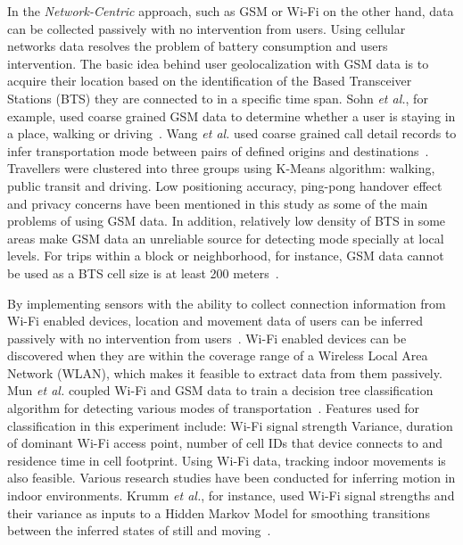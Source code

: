  In the \emph{Network-Centric} approach, such as GSM or Wi-Fi on the other hand, data can be collected passively with no intervention from users. Using cellular networks data resolves the problem of battery consumption and users intervention. The basic idea behind user geolocalization with GSM data is to acquire their location based on the identification of the Based Transceiver Stations (BTS) they are connected to in a specific time span. Sohn \textit{et al.}, for example, used coarse grained GSM data to determine whether a user is staying in a place, walking or driving~\cite{sohn2006mobility}.  Wang \textit{et al.} used coarse grained call detail records to infer transportation mode between pairs of defined origins and destinations~\cite{wang2010transportation}. Travellers were clustered into three groups using K-Means algorithm: walking, public transit and driving. Low positioning accuracy, ping-pong handover effect and privacy concerns have been mentioned in this study as some of the main problems of using GSM data. In addition, relatively low density of BTS in some areas make GSM data an unreliable source for detecting mode specially at local levels. For trips within a block or neighborhood, for instance, GSM data cannot be used as a BTS cell size is at least 200 meters~\cite{kalatian2016travel}.
 
 By implementing sensors with the ability to collect connection information from Wi-Fi enabled devices, location and movement data of users can be inferred passively with no intervention from users~\cite{farooq2015ubiquitous}. Wi-Fi enabled devices can be discovered when they are within the coverage range of a Wireless Local Area Network (WLAN), which makes it feasible to extract data from them passively.  Mun \textit{et al.} coupled Wi-Fi and GSM data to train a decision tree classification algorithm for detecting various modes of transportation~\cite{mun2008parsimonious}. Features used for classification in this experiment include: Wi-Fi signal strength Variance, duration of dominant Wi-Fi access point, number of cell IDs that device connects to and residence time in cell footprint. Using Wi-Fi data, tracking indoor movements is also feasible. Various research studies have been conducted for inferring motion in indoor environments. Krumm \textit{et al.}, for instance, used Wi-Fi signal strengths and their variance as inputs to a Hidden Markov Model for smoothing transitions between the inferred states of still and moving~\cite{krumm2004locadio}.
 
